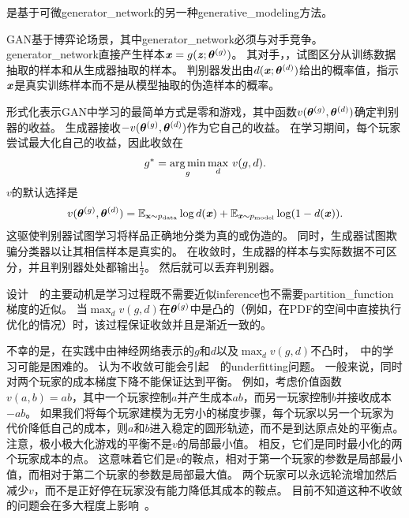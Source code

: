 \citep{Goodfellow-et-al-NIPS2014-small}是基于可微\gls{generator_network}的另一种\gls{generative_modeling}方法。


\gls{GAN}基于博弈论场景，其中\gls{generator_network}必须与对手竞争。
\gls{generator_network}直接产生样本$\boldsymbol{\mathit{x}} = g(\boldsymbol{\mathit{z}}; \boldsymbol{\theta}^{(g)})$。
其对手，，试图区分从训练数据抽取的样本和从生成器抽取的样本。
判别器发出由$d(\boldsymbol{\mathit{x}}; \boldsymbol{\theta}^{(d)})$给出的概率值，指示$\boldsymbol{\mathit{x}}$是真实训练样本而不是从模型抽取的伪造样本的概率。



形式化表示\gls{GAN}中学习的最简单方式是零和游戏，其中函数$v(\boldsymbol{\theta}^{(g)}, \boldsymbol{\theta}^{(d)})$确定判别器的收益。
生成器接收$-v(\boldsymbol{\theta}^{(g)}, \boldsymbol{\theta}^{(d)})$作为它自己的收益。
在学习期间，每个玩家尝试最大化自己的收益，因此收敛在
\begin{align}
 g^* = \underset{g}{\arg\min} \, \underset{d}{\max}~ v(g, d).
\end{align}
$v$的默认选择是
\begin{align}
 v(\boldsymbol{\theta}^{(g)}, \boldsymbol{\theta}^{(d)}) = \mathbb{E}_{\mathbf{x} \sim p_{\text{data}}} 
 \log d(\boldsymbol{\mathit{x}}) + \mathbb{E}_{\boldsymbol{\mathit{x}} \sim p_{\text{model}}} \log (1 - d(\boldsymbol{\mathit{x}})).
\end{align}
这驱使判别器试图学习将样品正确地分类为真的或伪造的。
同时，生成器试图欺骗分类器以让其相信样本是真实的。
在收敛时，生成器的样本与实际数据不可区分，并且判别器处处都输出$\frac{1}{2}$。
然后就可以丢弃判别器。


设计~~的主要动机是学习过程既不需要近似\gls{inference}也不需要\gls{partition_function}梯度的近似。
当$\max_d v(g,d)$在$\boldsymbol{\theta}^{(g)}$中是凸的（例如，在\gls{PDF}的空间中直接执行优化的情况）时，该过程保证收敛并且是渐近一致的。


不幸的是，在实践中由神经网络表示的$g$和$d$以及$\max_d v(g, d)$不凸时，~中的学习可能是困难的。
\citet{Goodfellow-ICLR2015}认为不收敛可能会引起~~的\gls{underfitting}问题。
一般来说，同时对两个玩家的成本梯度下降不能保证达到平衡。
例如，考虑价值函数$v(a,b) = ab$，其中一个玩家控制$a$并产生成本$ab$，而另一玩家控制$b$并接收成本$-ab$。
如果我们将每个玩家建模为无穷小的梯度步骤，每个玩家以另一个玩家为代价降低自己的成本，则$a$和$b$进入稳定的圆形轨迹，而不是到达原点处的平衡点。
注意，极小极大化游戏的平衡不是$v$的局部最小值。
相反，它们是同时最小化的两个玩家成本的点。
这意味着它们是$v$的鞍点，相对于第一个玩家的参数是局部最小值，而相对于第二个玩家的参数是局部最大值。
两个玩家可以永远轮流增加然后减少$v$，而不是正好停在玩家没有能力降低其成本的鞍点。
目前不知道这种不收敛的问题会在多大程度上影响~。
 
